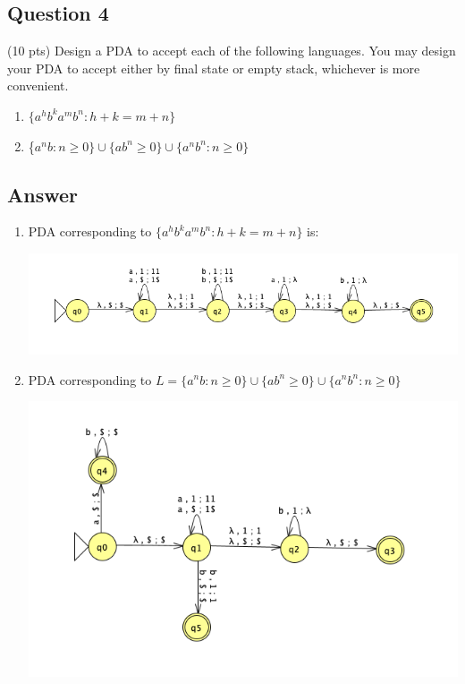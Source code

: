 \newpage
\subsection*{Question 4}

\noindent (10 pts) Design a PDA to accept each of the following languages. You may design your PDA to accept either by final state or empty stack, whichever is more convenient.
    
    \begin{enumerate}[label={(\alph*)}]
        \item $\{a^h b^k a^m b^n : h + k = m + n\}$
        \item \{$a^nb : n \geq 0\} \cup \{a b^n \geq 0 \} \cup \{a^nb^n : n \geq 0\}$
    \end{enumerate}


\subsection*{Answer}

\begin{enumerate}[label={(\alph*)}]
    \item
    \noindent PDA corresponding to $\{a^h b^k a^m b^n : h + k = m + n\}$ is:\\
    \begin{center}
        \includegraphics[width=1\textwidth]{img/graph1.png}
    \end{center}
    
    \item
    \noindent PDA corresponding to $L = \{a^nb : n \geq 0\} \cup \{a b^n \geq 0 \} \cup \{a^nb^n : n \geq 0\}$
    \begin{center}
        \includegraphics[width=1\textwidth]{img/graph2.png}
    \end{center}
\end{enumerate}